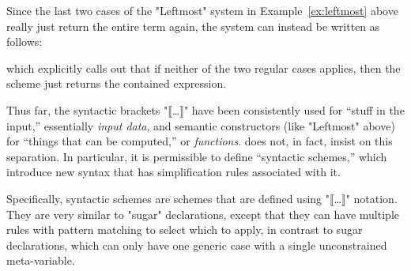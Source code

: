 \documentclass[11pt]{article} %
\begin{document}
\begin{notation}
\begin{enumerate}

\end{enumerate}
\end{notation}

\begin{example}
  Since the last two cases of the "Leftmost" system in Example~\ref{ex:leftmost} above really just
  return the entire term again, the system can instead be written as follows:
  which explicitly calls out that if neither of the two regular cases applies, then the scheme just
  returns the contained expression.
\end{example}

Thus far, the syntactic brackets "⟦…⟧" have been consistently used for ``stuff in the input,''
essentially \emph{input data}, and semantic constructors (like "Leftmost" above) for ``things that
can be computed,'' or \emph{functions}. \HAX does not, in fact, insist on this separation. In
particular, it is permissible to define ``syntactic schemes,'' which introduce new syntax that has
simplification rules associated with it.

Specifically, syntactic schemes are schemes that are defined using "⟦…⟧" notation. They are very
similar to "sugar" declarations, except that they can have multiple rules with pattern matching to
select which to apply, in contrast to sugar declarations, which can only have one generic case with
a single unconstrained meta-variable.
\end{document}
